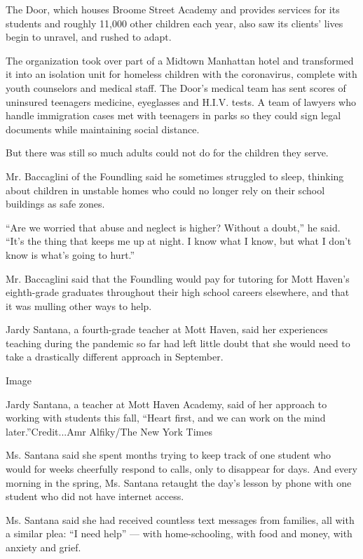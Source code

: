 The Door, which houses Broome Street Academy and provides services for
its students and roughly 11,000 other children each year, also saw its
clients' lives begin to unravel, and rushed to adapt.

The organization took over part of a Midtown Manhattan hotel and
transformed it into an isolation unit for homeless children with the
coronavirus, complete with youth counselors and medical staff. The
Door's medical team has sent scores of uninsured teenagers medicine,
eyeglasses and H.I.V. tests. A team of lawyers who handle immigration
cases met with teenagers in parks so they could sign legal documents
while maintaining social distance.

But there was still so much adults could not do for the children they
serve.

Mr. Baccaglini of the Foundling said he sometimes struggled to sleep,
thinking about children in unstable homes who could no longer rely on
their school buildings as safe zones.

``Are we worried that abuse and neglect is higher? Without a doubt,'' he
said. ``It's the thing that keeps me up at night. I know what I know,
but what I don't know is what's going to hurt.''

Mr. Baccaglini said that the Foundling would pay for tutoring for Mott
Haven's eighth-grade graduates throughout their high school careers
elsewhere, and that it was mulling other ways to help.

Jardy Santana, a fourth-grade teacher at Mott Haven, said her
experiences teaching during the pandemic so far had left little doubt
that she would need to take a drastically different approach in
September.

Image

Jardy Santana, a teacher at Mott Haven Academy, said of her approach to
working with students this fall, ``Heart first, and we can work on the
mind later.''Credit...Amr Alfiky/The New York Times

Ms. Santana said she spent months trying to keep track of one student
who would for weeks cheerfully respond to calls, only to disappear for
days. And every morning in the spring, Ms. Santana retaught the day's
lesson by phone with one student who did not have internet access.

Ms. Santana said she had received countless text messages from families,
all with a similar plea: ``I need help'' --- with home-schooling, with
food and money, with anxiety and grief.


